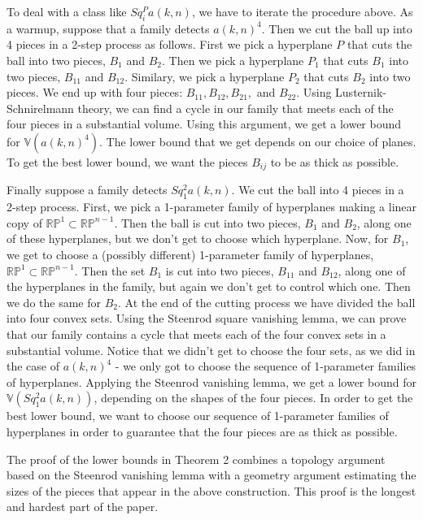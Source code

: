 \documentclass{amsart}
\newtheorem*{Theorem 1}{Theorem 1}
\newtheorem*{Theorem 2}{Theorem 2}
\newtheorem*{Theorem 1A}{Theorem 1A}
\newtheorem*{Theorem 2A}{Theorem 2A}
\newtheorem*{vanishing lemma}{Vanishing Lemma}
\numberwithin{equation}{section}
\begin{document}
To deal with a class like $Sq_i^P a(k,n)$, we have to iterate the procedure above.
As a warmup, suppose that a family detects $a(k,n)^4$.  Then we cut the ball up into 4 pieces in a
2-step process as follows.  First we pick a hyperplane $P$ that cuts
the ball into two pieces, $B_1$ and $B_2$.  Then we pick a hyperplane $P_1$ that cuts
$B_1$ into two pieces, $B_{11}$ and $B_{12}$.  Similary, we pick a hyperplane $P_2$ that
cuts $B_2$ into two pieces.  We end up with four pieces: $B_{11}, B_{12}, B_{21},$ and $B_{22}$.  Using
Lusternik-Schnirelmann theory, we can find a cycle in
our family that meets each of the four pieces in a substantial volume.  Using this argument,
we get a lower bound for $\mathbb{V}(a(k,n)^4)$.  
The lower bound that we get depends on our choice of planes.  To get
the best lower bound, we want the pieces $B_{ij}$ to be as thick as possible.

Finally suppose a family detects $Sq_1^2 a(k,n)$.  We cut the ball into 4 pieces in
a 2-step process.  First, we pick a 1-parameter family of hyperplanes making a linear copy of
$\mathbb{RP}^1 \subset \mathbb{RP}^{n-1}$.  Then the ball is cut into two pieces, $B_1$ and $B_2$,
along one of these hyperplanes, but we don't get to choose which hyperplane.  Now, for $B_1$, we get
to choose a (possibly different) 1-parameter family of hyperplanes, $\mathbb{RP}^1 
\subset \mathbb{RP}^{n-1}$.  Then the set $B_1$ is cut into two pieces, $B_{11}$ and $B_{12}$, along
one of the hyperplanes in the family, but again we don't get to control which one.  Then we do
the same for $B_2$.  At the end of the cutting process we have divided the ball into four
convex sets.  Using the Steenrod square vanishing lemma, we can prove that our family contains a cycle
that meets each of the four convex sets in a substantial volume.  Notice that we didn't get to choose
the four sets, as we did in the case of $a(k,n)^4$ - we only got to choose the sequence of
1-parameter families of hyperplanes.  Applying the Steenrod vanishing lemma, we get a lower 
bound for $\mathbb{V}(Sq_1^2 a(k,n))$, depending on the shapes of the four pieces.
In order to get the best lower bound, we want to choose our sequence of 1-parameter families
of hyperplanes in order to guarantee that the four pieces are as thick as possible.

The proof of the lower bounds in Theorem 2 combines a topology argument based on the Steenrod
vanishing lemma with a geometry argument estimating the sizes of the pieces that appear in
the above construction.  This proof is the longest and hardest part of the paper.
\end{document}
